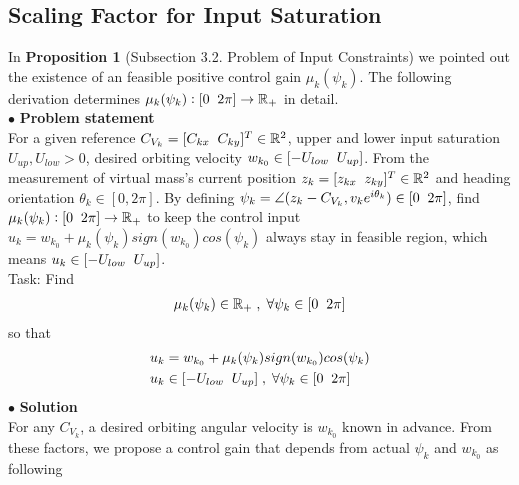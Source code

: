 \subsection{Scaling Factor for Input Saturation}
In \textbf{Proposition 1} (Subsection 3.2. Problem of Input Constraints) we pointed out the existence of an feasible positive control gain ${\mu_k(\psi_{k})}$. The following derivation determines ${\mu_k(\psi_{k}): [0 \txtspc{ } 2\pi] \rightarrow \mathbb{R}_+}$ in detail. \\
$\bullet$ \textbf{Problem statement}\\
For a given reference ${C_{V_{k}} = [C_{kx} \txtspc{ } C_{ky}]^{T} \in \mathbb{R}^{2}}$, upper and lower input saturation ${U_{up}, U_{low} > 0}$, desired orbiting velocity ${w_{k_0}\in [-U_{low} \txtspc{ } U_{up}]}$. From the measurement of virtual mass's current position ${z_{k} = [z_{kx} \txtspc{ } z_{ky}]^{T} \in \mathbb{R}^{2}}$ and heading orientation  ${\theta_{k} \in [0, 2\pi]}$. By defining ${\psi_{k} = \angle (z_{k} - C_{V_{k}}, v_{k}e^{i\theta_{k}}) \in [0 \txtspc{ } 2\pi]}$, find ${\mu_k(\psi_{k}): [0 \txtspc{ } 2\pi] \rightarrow \mathbb{R}_+}$ to keep the control input ${u_{k} = w_{k_0} + \mu_k(\psi_{k})sign(w_{k_0})cos(\psi_{k})}$ always stay in feasible region, which means ${u_{k} \in [-U_{low} \txtspc{ } U_{up}]}$. \\
Task: Find
\begin{equation} \notag
\begin{split}
&\mu_k(\psi_{k}) \in \mathbb{R}_+ \txtspc{,} \forall \psi_{k} \in [0 \txtspc{ } 2\pi]\\
\end{split}
\end{equation}
so that 
\begin{equation}
\begin{split}
& u_{k} = w_{k_0} + \mu_{k}(\psi_{k})sign(w_{k_0})cos(\psi_{k}) \\
& u_k \in [-U_{low} \txtspc{ } U_{up}] \txtspc{,} \forall \psi_{k} \in [0 \txtspc{ } 2\pi] \\
\end{split}
\end{equation}
\noindent $\bullet$ \textbf{Solution} \\
\noindent For any ${C_{V_{k}}}$, a desired orbiting angular velocity is ${w_{k_0}}$ known in advance. From these factors, we propose a control gain that depends from actual ${\psi_{k}}$ and ${w_{k_0}}$ as following \\


